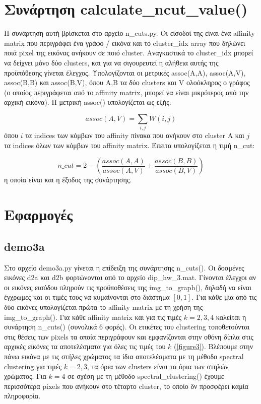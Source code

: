 \documentclass{article}
\begin{document}
\section{Συνάρτηση calculate\_ncut\_value()}
Η συνάρτηση αυτή βρίσκεται στο αρχείο n\_cuts.py. Οι είσοδοί της είναι ένα 
affinity matrix που περιγράφει ένα γράφο / εικόνα και το cluster\_idx array 
που δηλώνει ποιά pixel της εικόνας ανήκουν σε ποιό cluster. Αναγκαστικά το
cluster\_idx μπορεί να δείχνει μόνο δύο clusters, και για να σιγουρευτεί η
αλήθεια αυτής της προϋπόθεσης γίνεται έλεγχος. Υπολογίζονται οι 
μετρικές assoc(A,A), assoc(A,V), assoc(B,B) και assoc(B,V), όπου A,B τα δύο
clusters και V ολοόκληρος ο γράφος (ο οποίος περιγράφεται από το affinity
matrix, μπορεί να είναι μικρότερος από την αρχική εικόνα). Η μετρική assoc()
υπολογίζεται ως εξής:

\begin{equation}
    assoc(A,V) = \sum_{i, j} W(i, j)
\end{equation}
όπου $i$ τα indices των κόμβων του affinity πίνακα που ανήκουν στο cluster A
και $j$ τα indices όλων των κόμβων του affinity matrix. Έπειτα υπολογίζεται η 
τιμή n\_cut:

\begin{equation}
    n\_cut = 2 - \left(\frac{assoc(A,A)}{assoc(A,V)} + \frac{assoc(B,B)}{assoc(B,V)}\right)
\end{equation}
η οποία είναι και η έξοδος της συνάρτησης.

\section{Εφαρμογές}
\subsection{demo3a} 
Στο αρχείο demo3a.py γίνεται η επίδειξη της συνάρτησης n\_cuts(). Οι
δοσμένες εικόνες d2a και d2b φορτώνονται από το αρχείο 
dip\_hw\_3.mat. Γίνονται έλεγχοι αν οι εικόνες εισόδου πληρούν τις προϋποθέσεις 
της img\_to\_graph(), δηλαδή να είναι έγχρωμες και οι τιμές τους να κυμαίνονται 
στο διάστημα $[0,1]$. Για κάθε μία από τις δύο εικόνες υπολογίζεται πρώτα το
affinity matrix με τη χρήση της img\_to\_graph(). Για κάθε affinity matrix και 
για τις τιμές $k=2,3,4$ καλείται η συνάρτηση n\_cuts() (συνολικά 6 φορές).
Οι ετικέτες του clustering τοποθετούνται στις θέσεις των pixels τα οποία περιγράφουν
και εμφανίζονται στην οθόνη δίπλα στις αρχικές εικόνες τα αποτελέσματα για όλες 
τις τιμές του $k$ (\autoref{figure3}). Βλέπουμε στην πάνω εικόνα με τις στήλες χρώματος
τα ίδια αποτελέσματα με τη μέθοδο spectral clustering για τιμές $k=2,3$, τα όρια 
των clusters είναι τα όρια των στηλών χρώματος. Για $k=4$ σε σχέση με τη μέθοδο 
spectral\_clustering() έχουμε περισσότερα
pixels που ανήκουν στο τέταρτο cluster, το οποίο δν προσφέρει καμία πληροφορία.
\end{document}
